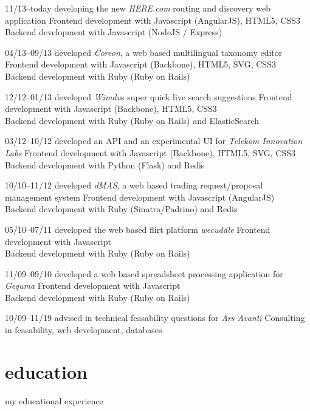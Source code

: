 \documentclass[]{friggeri-cv}
\begin{document}
\begin{entrylist}
  \entry
    {11/13–today}
    {developing the new \emph{HERE.com} routing and discovery web application}
    {}
    {Frontend development with Javascript (AngularJS), HTML5, CSS3\\
     Backend development with Javascript (NodeJS / Express)}

  \entry
    {04/13–09/13}
    {developed \emph{Coreon}, a web based multilingual taxonomy editor}
    {}
    {Frontend development with Javascript (Backbone), HTML5, SVG, CSS3\\
     Backend development with Ruby (Ruby on Rails)}

  \entry
    {12/12–01/13}
    {developed \emph{Wimdu}s super quick live search suggestions}
    {}
    {Frontend development with Javascript (Backbone), HTML5, CSS3\\
     Backend development with Ruby (Ruby on Rails) and ElasticSearch}

  \entry
    {03/12–10/12}
    {developed an API and an experimental UI for \emph{Telekom Innovation Labs}}
    {}
    {Frontend development with Javascript (Backbone), HTML5, SVG, CSS3\\
     Backend development with Python (Flask) and Redis}

  \entry
    {10/10–11/12}
    {developed \emph{dMAS}, a web based trading request/proposal management system}
    {}
    {Frontend development with Javascript (AngularJS)\\
     Backend development with Ruby (Sinatra/Padrino) and Redis}

  \entry
    {05/10–07/11}
    {developed the web based flirt platform \emph{wecuddle}}
    {}
    {Frontend development with Javascript\\
     Backend development with Ruby (Ruby on Rails)}

  \entry
    {11/09–09/10}
    {developed a web based spreadsheet processing application for \emph{Gequma}}
    {}
    {Frontend development with Javascript\\
     Backend development with Ruby (Ruby on Rails)}

  \entry
    {10/09–11/19}
    {advised in technical feasability questions for \emph{Ars Avanti}}
    {}
    {Consulting in feasability, web development, databases}


\end{entrylist}


\section{education}
my educational experience
\end{document}
